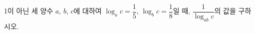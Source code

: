 1이 아닌 세 양수 $a$, $b$, $c$에 대하여 $\log_a c=\dfrac{1}{5}$, $\log_b c=\dfrac{1}{8}$일 때, $\dfrac{1}{\log_{ab} c}$의 값을 구하시오.
